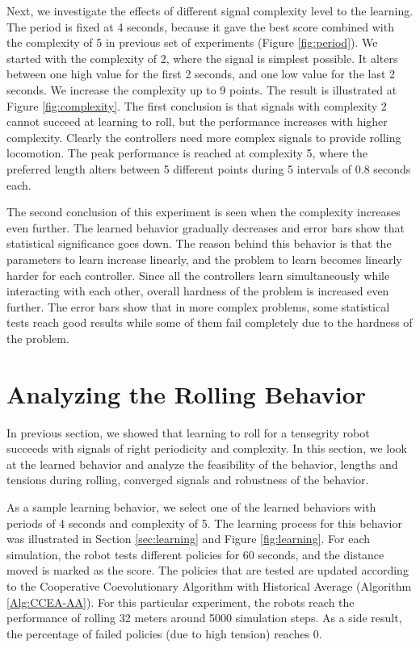 \documentclass[twocolumn,10pt]{asme2ej}
\begin{document}
Next, we investigate the effects of different signal complexity level to the learning.  The period is fixed at 4 seconds, because it gave the best score combined with the complexity of 5 in previous set of experiments (Figure \ref{fig:period}). We started with the complexity of 2, where the signal is simplest possible. It alters between one high value for the first 2 seconds, and one low value for the last 2 seconds. We increase the complexity up to 9 points. The result is illustrated at Figure \ref{fig:complexity}.  The first conclusion is that signals with complexity 2 cannot succeed at learning to roll, but the performance increases with higher complexity. Clearly the controllers need more complex signals to provide rolling locomotion. The peak performance is reached at complexity 5, where the preferred length alters between 5 different points during 5 intervals of 0.8 seconds each. 

The second conclusion of this experiment is seen when the complexity increases even further.  The learned behavior gradually decreases and error bars show that statistical significance goes down. The reason behind this behavior is that the parameters to learn increase linearly, and the problem to learn becomes linearly harder for each controller. Since all the controllers learn simultaneously while interacting with each other, overall hardness of the problem is increased even further. The error bars show that in more complex problems, some statistical tests reach good results while some of them fail completely due to the hardness of the problem.

\section{Analyzing the Rolling Behavior}
\label{sec:results}

In previous section, we showed that learning to roll for a tensegrity robot succeeds with signals of right periodicity and complexity. In this section, we look at the learned behavior and analyze 
the feasibility of the behavior, lengths and tensions during rolling, converged signals and robustness of the behavior.

As a sample learning behavior, we select one of the learned behaviors with periods of 4 seconds and complexity of 5. The learning process for this behavior was illustrated in Section \ref{sec:learning} and Figure \ref{fig:learning}. For each simulation, the robot tests different policies for 60 seconds, and the distance moved is marked as the score. The policies that are tested are updated according to the Cooperative Coevolutionary Algorithm with Historical Average (Algorithm \ref{Alg:CCEA-AA}). For this particular experiment, the robots reach the performance of rolling 32 meters around 5000 simulation steps. As a side result, the percentage of failed policies (due to high tension) reaches 0.
\end{document}
